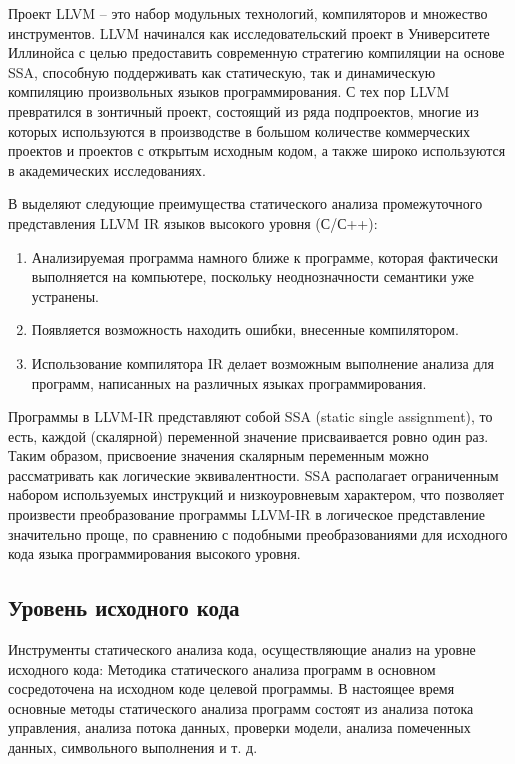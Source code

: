 Проект LLVM -- это набор модульных технологий, компиляторов и множество инструментов. LLVM начинался как исследовательский проект в Университете 
Иллинойса с целью предоставить современную стратегию компиляции на основе SSA, способную поддерживать как статическую, так и динамическую компиляцию 
произвольных языков программирования. С тех пор LLVM превратился в зонтичный проект, состоящий из ряда подпроектов, многие из которых используются в 
производстве в большом количестве коммерческих проектов и проектов с открытым исходным кодом, а также широко используются в академических 
исследованиях\cite{Chow2013IR}.

В \cite{10.1007/978-3-642-27705-4_12} выделяют следующие преимущества статического анализа промежуточного представления LLVM IR языков высокого уровня (С/С++):
\begin{enumerate}
    \item Анализируемая программа намного ближе к программе, которая фактически выполняется на компьютере, поскольку неоднозначности семантики уже 
          устранены. 
    \item Появляется возможность находить ошибки, внесенные компилятором.
    \item Использование компилятора IR делает возможным выполнение анализа для программ, написанных на различных языках программирования.
\end{enumerate}

Программы в LLVM-IR представляют собой SSA (static single assignment), то есть, каждой (скалярной) переменной значение присваивается ровно один раз.
Таким образом, присвоение значения скалярным переменным можно рассматривать как логические эквивалентности. SSA располагает ограниченным набором 
используемых инструкций и  низкоуровневым характером, что позволяет произвести преобразование программы LLVM-IR в логическое представление значительно 
проще, по сравнению с подобными преобразованиями для исходного кода языка программирования высокого уровня\cite{10.1007/978-3-642-27705-4_12}.

\subsection{Уровень исходного кода}
Инструменты статического анализа кода, осуществляющие анализ на уровне исходного кода:
Методика статического анализа программ в основном сосредоточена на исходном коде целевой программы.
В настоящее время основные методы статического анализа программ состоят из анализа потока управления, анализа потока данных, проверки модели, анализа помеченных данных, символьного выполнения и т. д.


